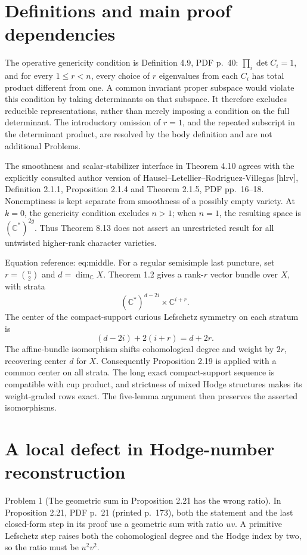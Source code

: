 \documentclass[10pt]{article}
\begin{document}
\section*{Definitions and main proof dependencies}
The operative genericity condition is Definition 4.9, PDF p. 40: \(\prod_i\det C_i=1\), and for every \(1\le r<n\), every choice of \(r\) eigenvalues from each \(C_i\) has total product different from one. A common invariant proper subspace would violate this condition by taking determinants on that subspace. It therefore excludes reducible representations, rather than merely imposing a condition on the full determinant. The introductory omission of \(r=1\), and the repeated subscript in the determinant product, are resolved by the body definition and are not additional Problems.\par
The smoothness and scalar-stabilizer interface in Theorem 4.10 agrees with the explicitly consulted author version of Hausel–Letellier–Rodriguez-Villegas [hlrv], Definition 2.1.1, Proposition 2.1.4 and Theorem 2.1.5, PDF pp. 16–18. Nonemptiness is kept separate from smoothness of a possibly empty variety. At \(k=0\), the genericity condition excludes \(n>1\); when \(n=1\), the resulting space is \((\mathbb C^*)^{2g}\). Thus Theorem 8.13 does not assert an unrestricted result for all untwisted higher-rank character varieties.\par
Equation reference: eq:middle. For a regular semisimple last puncture, set \(r=\binom n2\) and \(d=\dim_{\mathbb C}X\). Theorem 1.2 gives a rank-\(r\) vector bundle over \(X\), with strata \[(\mathbb C^*)^{d-2i}\times\mathbb C^{i+r}.\] The center of the compact-support curious Lefschetz symmetry on each stratum is \[
 (d-2i)+2(i+r)=d+2r.\] The affine-bundle isomorphism shifts cohomological degree and weight by \(2r\), recovering center \(d\) for \(X\). Consequently Proposition 2.19 is applied with a common center on all strata. The long exact compact-support sequence is compatible with cup product, and strictness of mixed Hodge structures makes its weight-graded rows exact. The five-lemma argument then preserves the asserted isomorphisms.\par
\section*{A local defect in Hodge-number reconstruction}
Problem 1 (The geometric sum in Proposition 2.21 has the wrong ratio).  In Proposition 2.21, PDF p. 21 (printed p. 173), both the statement and the last closed-form step in its proof use a geometric sum with ratio \(uv\). A primitive Lefschetz step raises both the cohomological degree and the Hodge index by two, so the ratio must be \(u^2v^2\).\par
\end{document}
